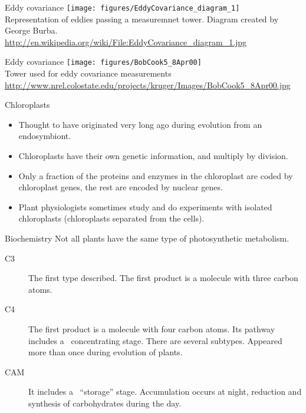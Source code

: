 \documentclass[10pt]{beamer}
\begin{document}
\begin{frame}{Eddy covariance}
    \centering
    \texttt{[image: figures/EddyCovariance\_diagram\_1]}\\
    {\small Representation of eddies passing a measuremnet tower. Diagram created by George Burba.}
    {\tiny \url{http://en.wikipedia.org/wiki/File:EddyCovariance_diagram_1.jpg}}
\end{frame}

\begin{frame}{Eddy covariance}
    \centering
    \texttt{[image: figures/BobCook5\_8Apr00]}\\
    {\small Tower used for eddy covariance measurements} {\tiny \url{http://www.nrel.colostate.edu/projects/kruger/Images/BobCook5_8Apr00.jpg}}
\end{frame}

\begin{frame}{Chloroplasts}
    \begin{itemize}
        \item Thought to have originated very long ago during
        evolution from an endosymbiont.
        \item Chloroplasts have their own genetic information, and
        multiply by division.
        \item Only a fraction of the proteins and enzymes in the
        chloroplast are coded by chloroplast genes, the rest are
        encoded by nuclear genes.
        \item Plant physiologists sometimes study and do experiments
        with isolated chloroplasts (chloroplasts separated from the
        cells).
    \end{itemize}
\end{frame}

\begin{frame}{Biochemistry}
    Not all plants have the same type of photosynthetic
    metabolism.
    \begin{description}
        \item[C3] The first type described. The first product is
        a molecule with three carbon atoms.
        \item[C4] The first product is a molecule with four carbon
        atoms. Its pathway includes a \COtwo\ concentrating stage.
        There are several subtypes. Appeared
        more than once during evolution of plants.
        \item[CAM] It includes a \COtwo\ ``storage'' stage.
        Accumulation occurs at night, reduction and synthesis of
        carbohydrates during the day.
    \end{description}
\end{frame}
\end{document}
